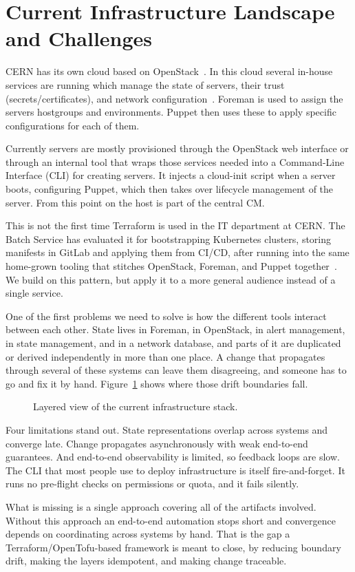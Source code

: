 \section{Current Infrastructure Landscape and Challenges}\label{infra}

CERN has its own cloud based on OpenStack~\cite{dupuis2025,savchenko2024preparing}. In this cloud several in-house services are running which manage the state of servers, their trust (secrets/certificates), and network configuration~\cite{martelli2018}. Foreman is used to assign the servers hostgroups and environments. Puppet then uses these to apply specific configurations for each of them.

Currently servers are mostly provisioned through the OpenStack web interface or through an internal tool that wraps those services needed into a Command-Line Interface (CLI) for creating servers. It injects a cloud-init script when a server boots, configuring Puppet, which then takes over lifecycle management of the server. From this point on the host is part of the central CM.

This is not the first time Terraform is used in the IT department at CERN. The Batch Service has evaluated it for bootstrapping Kubernetes clusters, storing manifests in GitLab and applying them from CI/CD, after running into the same home-grown tooling that stitches OpenStack, Foreman, and Puppet together~\cite{alvarez2020batch}. We build on this pattern, but apply it to a more general audience instead of a single service.

One of the first problems we need to solve is how the different tools interact between each other. State lives in Foreman, in OpenStack, in alert management, in state management, and in a network database, and parts of it are duplicated or derived independently in more than one place. A change that propagates through several of these systems can leave them disagreeing, and someone has to go and fix it by hand. Figure~\ref{fig:state-boundaries} shows where those drift boundaries fall.

\begin{figure}[tbp]
  \centering
    \scalebox{0.88}{}
  \caption{Layered view of the current infrastructure stack.}
  \label{fig:state-boundaries}
\end{figure}

Four limitations stand out. State representations overlap across systems and converge late. Change propagates asynchronously with weak end-to-end guarantees. And end-to-end observability is limited, so feedback loops are slow. The CLI that most people use to deploy infrastructure is itself fire-and-forget. It runs no pre-flight checks on permissions or quota, and it fails silently.

What is missing is a single approach covering all of the artifacts involved. Without this approach an end-to-end automation stops short and convergence depends on coordinating across systems by hand. That is the gap a Terraform/OpenTofu-based framework is meant to close, by reducing boundary drift, making the layers idempotent, and making change traceable.

